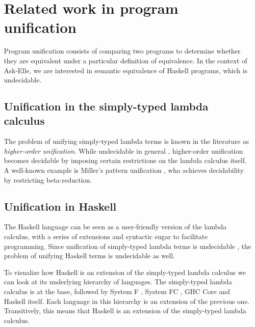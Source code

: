 




\section{Related work in program unification}
\label{sec:related-work-unification}

Program unification consists of comparing two programs to determine whether they are equivalent under a particular definition of equivalence. In the context of Ask-Elle, we are interested in semantic equivalence of Haskell programs, which is undecidable.

\subsection{Unification in the simply-typed lambda calculus}

The problem of unifying simply-typed lambda terms is known in the literature as \emph{higher-order unification}. While undecidable in general \cite{2013barendregt}, higher-order unification becomes decidable by imposing certain restrictions on the lambda calculus itself. A well-known example is Miller's pattern unification \cite{1991miller}, who achieves decidability by restricting beta-reduction.

\subsection{Unification in Haskell}

The Haskell language can be seen as a user-friendly version of the lambda calculus, with a series of extensions and syntactic sugar to facilitate programming. Since unification of simply-typed lambda terms is undecidable \cite{2013barendregt}, the problem of unifying Haskell terms is undecidable as well.

To visualize how Haskell is an extension of the simply-typed lambda calculus we can look at its underlying hierarchy of languages. The simply-typed lambda calculus is at the base, followed by System F \cite{2002pierce}, System FC \cite{2007systemfc}, GHC Core \cite{2007systemfc} and Haskell itself. Each language in this hierarchy is an extension of the previous one. Transitively, this means that Haskell is an extension of the simply-typed lambda calculus.

